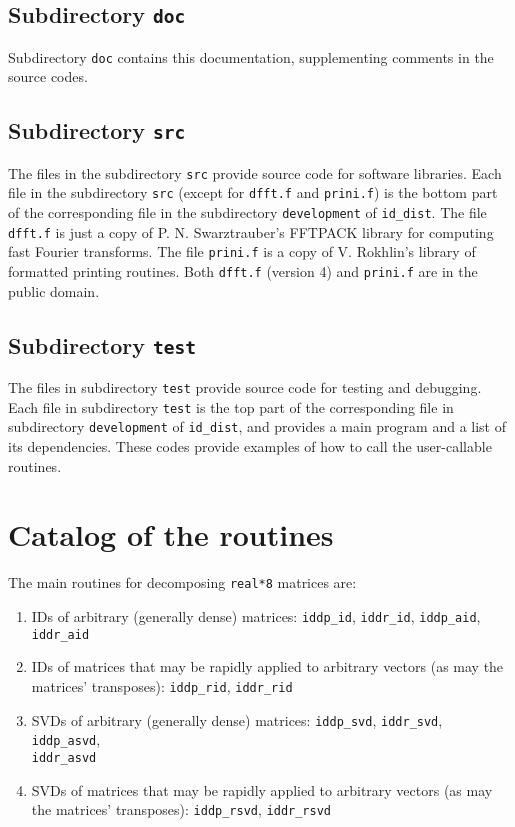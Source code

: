﻿\documentclass[letterpaper,12pt]{article}
\begin{document}
\subsection{Subdirectory {\tt doc}}

Subdirectory {\tt doc} contains this documentation,
supplementing comments in the source codes.


\subsection{Subdirectory {\tt src}}

The files in the subdirectory {\tt src} provide source code
for software libraries. Each file in the subdirectory {\tt src}
(except for {\tt dfft.f} and {\tt prini.f}) is
the bottom part of the corresponding file
in the subdirectory {\tt development} of {\tt id\_dist}.
The file {\tt dfft.f} is just a copy
of P. N. Swarztrauber's FFTPACK library
for computing fast Fourier transforms.
The file {\tt prini.f} is a copy of V. Rokhlin's library
of formatted printing routines.
Both {\tt dfft.f} (version 4) and {\tt prini.f} are in the public domain.


\subsection{Subdirectory {\tt test}}

The files in subdirectory {\tt test} provide source code
for testing and debugging. Each file in subdirectory {\tt test} is
the top part of the corresponding file
in subdirectory {\tt development} of {\tt id\_dist},
and provides a main program and a list of its dependencies.
These codes provide examples of how to call the user-callable routines.



\section{Catalog of the routines}

The main routines for decomposing {\tt real*8} matrices are:
%
\begin{enumerate}
%
\item IDs of arbitrary (generally dense) matrices:
{\tt iddp\_id}, {\tt iddr\_id}, {\tt iddp\_aid}, {\tt iddr\_aid}
%
\item IDs of matrices that may be rapidly applied to arbitrary vectors
(as may the matrices' transposes):
{\tt iddp\_rid}, {\tt iddr\_rid}
%
\item SVDs of arbitrary (generally dense) matrices:
{\tt iddp\_svd}, {\tt iddr\_svd}, {\tt iddp\_asvd},\\{\tt iddr\_asvd}
%
\item SVDs of matrices that may be rapidly applied to arbitrary vectors
(as may the matrices' transposes):
{\tt iddp\_rsvd}, {\tt iddr\_rsvd}
%
\end{enumerate}
\end{document}
